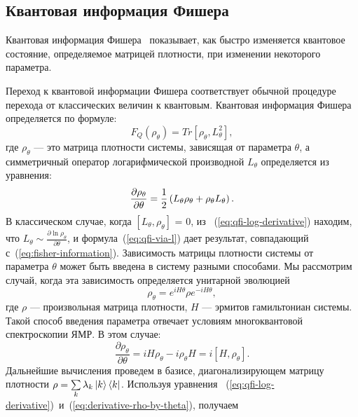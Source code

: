 \subsection{Квантовая информация Фишера}
\label{sec:quantum-fisher-information}
\begin{definition}\label{def:quantum-fisher-information}
  Квантовая информация Фишера~\cite{liu2014} показывает,
  как быстро изменяется квантовое состояние,
  определяемое матрицей плотности, при изменении некоторого параметра.
\end{definition}
Переход к квантовой информации Фишера соответствует обычной процедуре перехода от классических величин к квантовым.
Квантовая информация Фишера определяется по формуле:
%
\begin{equation}\label{eq:qfi-via-l}
  F_Q (\rho_\theta) = Tr[\rho_\theta, L^2_\theta],
\end{equation}
%
где $\rho_\theta$ --- это матрица плотности системы, зависящая от параметра $\theta$, а симметричный оператор логарифмической производной $L_\theta$ определяется из уравнения:
%
\begin{equation}\label{eq:qfi-log-derivative}
  \frac{\partial\rho_\theta}{\partial\theta}
  = \frac{1}{2} \left( L_\theta \rho_\theta + \rho_\theta L_\theta \right).
\end{equation}
%
В классическом случае, когда $\left[L_\theta, \rho_\theta \right]$ = 0, из ~(\ref{eq:qfi-log-derivative}) находим,
что ${L_\theta\sim\frac{\partial\ln\rho_\theta}{\partial\theta}}$,
и формула~(\ref{eq:qfi-via-l}) дает результат, совпадающий с~(\ref{eq:fisher-information}).
%
Зависимость матрицы плотности системы от параметра $\theta$ может быть введена в систему разными способами.
Мы рассмотрим случай, когда эта зависимость определяется унитарной эволюцией
%
\begin{equation}%
  \rho_\theta = e^{i H \theta} \rho e^{-i H \theta},
\end{equation}
%
где $\rho$ --- произвольная матрица плотности, $H$ --- эрмитов гамильтониан системы.
Такой способ введения параметра отвечает условиям многоквантовой спектроскопии ЯМР.
В этом случае:
%
\begin{equation}\label{eq:derivative-rho-by-theta}
  \frac{\partial\rho_\theta}{\partial\theta}
  = iH\rho_\theta - i\rho_\theta H
  = i \left[H,\rho_\theta \right].
\end{equation}
%
Дальнейшие вычисления проведем в базисе, диагонализирующем матрицу плотности
$\rho =\sum\limits_{k} \lambda_k \left| k \right\rangle\left\langle k \right|$.
Используя уравнения ~(\ref{eq:qfi-log-derivative})~и~(\ref{eq:derivative-rho-by-theta}), получаем
